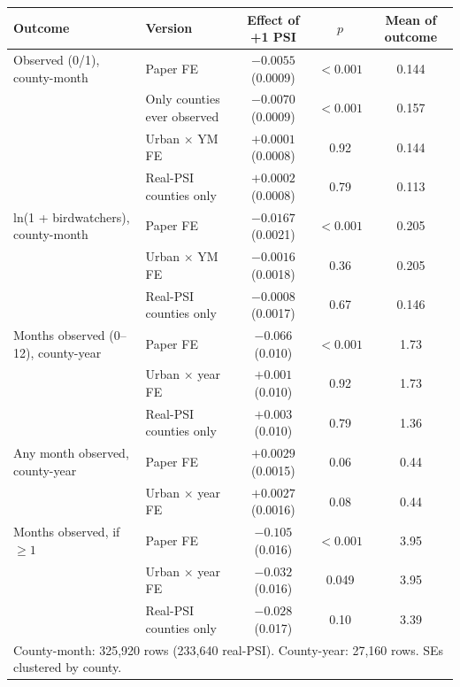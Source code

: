 \documentclass[11pt]{article}
\begin{document}
\begin{center}
\footnotesize
\setlength{\tabcolsep}{3pt}
\begin{tabular}{l l c c c}
\toprule
Outcome & Version & Effect of +1 PSI & $p$ & Mean of outcome \\
\midrule
Observed (0/1), county-month & Paper FE & $-0.0055$ (0.0009) & $<0.001$ & 0.144 \\
 & Only counties ever observed & $-0.0070$ (0.0009) & $<0.001$ & 0.157 \\
 & Urban $\times$ YM FE & $+0.0001$ (0.0008) & 0.92 & 0.144 \\
 & Real-PSI counties only & $+0.0002$ (0.0008) & 0.79 & 0.113 \\
\addlinespace
ln(1 + birdwatchers), county-month & Paper FE & $-0.0167$ (0.0021) & $<0.001$ & 0.205 \\
 & Urban $\times$ YM FE & $-0.0016$ (0.0018) & 0.36 & 0.205 \\
 & Real-PSI counties only & $-0.0008$ (0.0017) & 0.67 & 0.146 \\
\addlinespace
Months observed (0--12), county-year & Paper FE & $-0.066$ (0.010) & $<0.001$ & 1.73 \\
 & Urban $\times$ year FE & $+0.001$ (0.010) & 0.92 & 1.73 \\
 & Real-PSI counties only & $+0.003$ (0.010) & 0.79 & 1.36 \\
\addlinespace
Any month observed, county-year & Paper FE & $+0.0029$ (0.0015) & 0.06 & 0.44 \\
 & Urban $\times$ year FE & $+0.0027$ (0.0016) & 0.08 & 0.44 \\
\addlinespace
Months observed, if $\ge 1$ & Paper FE & $-0.105$ (0.016) & $<0.001$ & 3.95 \\
 & Urban $\times$ year FE & $-0.032$ (0.016) & 0.049 & 3.95 \\
 & Real-PSI counties only & $-0.028$ (0.017) & 0.10 & 3.39 \\
\bottomrule
\multicolumn{5}{l}{\footnotesize County-month: 325,920 rows (233,640 real-PSI). County-year: 27,160 rows. SEs clustered by county.}
\end{tabular}
\end{center}
\end{document}
